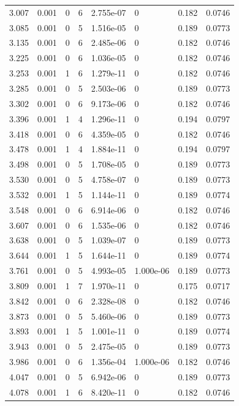 \documentclass[preview]{standalone}
\begin{document}
{{{\begin{tabular}{L{1.2cm}C{1.2cm} C{0.3cm}C{0.5cm} C{1.4cm}C{1.4cm} C{1.4cm}C{1.4cm}}
  3.007  &  0.001  & 0     &  6 &  2.755e-07  & 0  & 0.182 &  0.0746   \\ 
  3.085  &  0.001  & 0     &  5 &  1.516e-05  & 0  & 0.189 &  0.0773   \\ 
  3.135  &  0.001  & 0     &  6 &  2.485e-06  & 0  & 0.182 &  0.0746   \\ 
  3.225  &  0.001  & 0     &  6 &  1.036e-05  & 0  & 0.182 &  0.0746   \\ 
  3.253  &  0.001  & 1     &  6 &  1.279e-11  & 0  & 0.182 &  0.0746   \\ 
  3.285  &  0.001  & 0     &  5 &  2.503e-06  & 0  & 0.189 &  0.0773   \\ 
  3.302  &  0.001  & 0     &  6 &  9.173e-06  & 0  & 0.182 &  0.0746   \\ 
  3.396  &  0.001  & 1     &  4 &  1.296e-11  & 0  & 0.194 &  0.0797   \\ 
  3.418  &  0.001  & 0     &  6 &  4.359e-05  & 0  & 0.182 &  0.0746   \\ 
  3.478  &  0.001  & 1     &  4 &  1.884e-11  & 0  & 0.194 &  0.0797   \\ 
  3.498  &  0.001  & 0     &  5 &  1.708e-05  & 0  & 0.189 &  0.0773   \\ 
  3.530  &  0.001  & 0     &  5 &  4.758e-07  & 0  & 0.189 &  0.0773   \\ 
  3.532  &  0.001  & 1     &  5 &  1.144e-11  & 0  & 0.189 &  0.0774   \\ 
  3.548  &  0.001  & 0     &  6 &  6.914e-06  & 0  & 0.182 &  0.0746   \\ 
  3.607  &  0.001  & 0     &  6 &  1.535e-06  & 0  & 0.182 &  0.0746   \\ 
  3.638  &  0.001  & 0     &  5 &  1.039e-07  & 0  & 0.189 &  0.0773   \\ 
  3.644  &  0.001  & 1     &  5 &  1.644e-11  & 0  & 0.189 &  0.0774   \\ 
  3.761  &  0.001  & 0     &  5 &  4.993e-05  & 1.000e-06  & 0.189 &  0.0773   \\ 
  3.809  &  0.001  & 1     &  7 &  1.970e-11  & 0  & 0.175 &  0.0717   \\ 
  3.842  &  0.001  & 0     &  6 &  2.328e-08  & 0  & 0.182 &  0.0746   \\ 
  3.873  &  0.001  & 0     &  5 &  5.460e-06  & 0  & 0.189 &  0.0773   \\ 
  3.893  &  0.001  & 1     &  5 &  1.001e-11  & 0  & 0.189 &  0.0774   \\ 
  3.943  &  0.001  & 0     &  5 &  2.475e-05  & 0  & 0.189 &  0.0773   \\ 
  3.986  &  0.001  & 0     &  6 &  1.356e-04  & 1.000e-06  & 0.182 &  0.0746   \\ 
  4.047  &  0.001  & 0     &  5 &  6.942e-06  & 0  & 0.189 &  0.0773   \\ 
  4.078  &  0.001  & 1     &  6 &  8.420e-11  & 0  & 0.182 &  0.0746   \\ 
\hline 
\end{tabular} 

}}}
\end{document}
